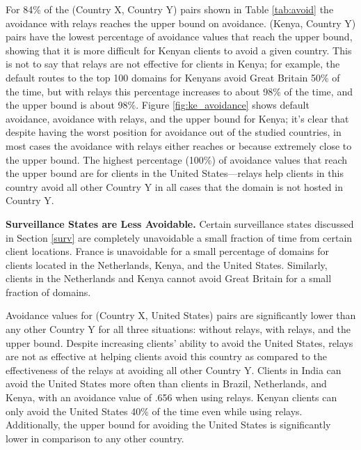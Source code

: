 
For 84\% of the (Country X, Country Y) pairs shown in Table \ref{tab:avoid} the avoidance with relays reaches the upper bound on avoidance.  (Kenya, Country Y) pairs have the lowest percentage of avoidance values that reach the upper bound, showing that it is more difficult for Kenyan clients to avoid a given country.  This is not to say that relays are not effective for clients in Kenya; for example, the default routes to the top 100 domains for Kenyans avoid Great Britain 50\% of the time, but with relays this percentage increases to about 98\% of the time, and the upper bound is about 98\%. Figure \ref{fig:ke_avoidance} shows default avoidance, avoidance with relays, and the upper bound for Kenya; it's clear that despite having the worst position for avoidance out of the studied countries, in most cases the avoidance with relays either reaches or because extremely close to the upper bound.  The highest percentage (100\%) of avoidance values that reach the upper bound are for clients in the United States---relays help clients in this country avoid all other Country Y in all cases that the domain is not hosted in Country Y.  

{\bf Surveillance States are Less Avoidable.}
Certain surveillance states discussed in Section \ref{surv} are completely unavoidable a small fraction of time from certain client locations.  France is unavoidable for a small percentage of domains for clients located in the Netherlands, Kenya, and the United States.  Similarly, clients in the Netherlands and Kenya cannot avoid Great Britain for a small fraction of domains.  

Avoidance values for (Country X, United States) pairs are significantly lower than any other Country Y for all three situations: without relays, with relays, and the upper bound.   Despite increasing clients' ability to avoid the United States, relays are not as effective at helping clients avoid this country as compared to the effectiveness of the relays at avoiding all other Country Y.  Clients in India can avoid the United States more often than clients in Brazil, Netherlands, and Kenya, with an avoidance value of .656 when using relays.  Kenyan clients can only avoid the United States 40\% of the time even while using relays.  Additionally, the upper bound for avoiding the United States is significantly lower in comparison to any other country.  

